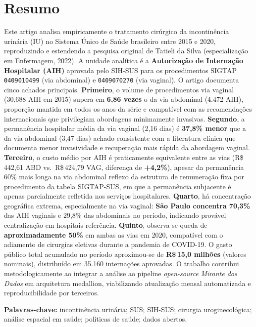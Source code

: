 \documentclass[12pt,a4paper,oneside]{article}
\newcommand{\rs}{R\$\,}
\begin{document}
\section*{Resumo}
\begin{singlespace}\small\noindent
Este artigo analisa empiricamente o tratamento cirúrgico da incontinência
urinária (IU) no Sistema Único de Saúde brasileiro entre 2015 e 2020,
reproduzindo e estendendo a pesquisa original de Tatieli da Silva
(especialização em Enfermagem, 2022). A unidade analítica é a
\textbf{Autorização de Internação Hospitalar (AIH)} aprovada pelo
SIH-SUS para os procedimentos SIGTAP \texttt{0409010499} (via abdominal)
e \texttt{0409070270} (via vaginal). O artigo documenta cinco achados
principais. \textbf{Primeiro}, o volume de procedimentos via vaginal
(30.688 AIH em 2015) supera em \textbf{6{,}86 vezes} o
da via abdominal (4.472 AIH), proporção mantida em todos os anos da
série e compatível com as recomendações internacionais que privilegiam
abordagens minimamente invasivas. \textbf{Segundo}, a permanência
hospitalar média da via vaginal (2{,}16 dias) é \textbf{37{,}8\%
menor} que a da via abdominal (3{,}47 dias) \textemdash{} achado
consistente com a literatura clínica que documenta menor invasividade
e recuperação mais rápida da abordagem vaginal. \textbf{Terceiro}, o
custo médio por AIH é praticamente equivalente entre as vias
(\rs 442{,}61 ABD vs.\ \rs 424{,}79 VAG, diferença de \textbf{+4{,}2\%}),
apesar da permanência 60\% mais longa na via abdominal \textemdash{}
reflexo da estrutura de remuneração fixa por procedimento da tabela
SIGTAP-SUS, em que a permanência subjacente é apenas parcialmente
refletida nos serviços hospitalares. \textbf{Quarto}, há concentração
geográfica extrema, especialmente na via vaginal: \textbf{São Paulo
concentra 70{,}3\%} das AIH vaginais e 29{,}8\% das abdominais no
período, indicando provável centralização em hospitais-referência.
\textbf{Quinto}, observa-se queda de \textbf{aproximadamente 50\%}
em ambas as vias em 2020, compatível com o adiamento de cirurgias
eletivas durante a pandemia de COVID-19. O gasto público total
acumulado no período aproximou-se de \textbf{\rs 15{,}0 milhões}
(valores nominais), distribuído em 35.160 internações aprovadas. O
trabalho contribui metodologicamente ao integrar a análise ao pipeline
\textit{open-source} \textit{Mirante dos Dados} em arquitetura
medallion, viabilizando atualização mensal automatizada e
reproducibilidade por terceiros.

\vspace{0.4cm}\noindent\textbf{Palavras-chave:}
incontinência urinária; SUS; SIH-SUS; cirurgia uroginecológica;
análise espacial em saúde; políticas de saúde; dados abertos.
\end{singlespace}
\end{document}
